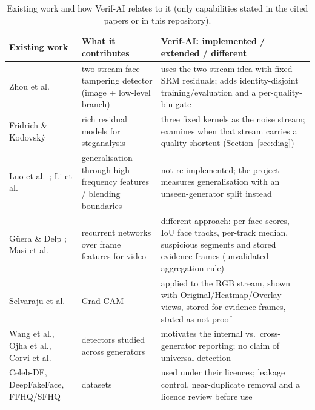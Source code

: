 \begin{table}[ht]
\centering
\caption[Existing work and how Verif-AI relates to it (only capabilities stated in the cited papers or]{Existing work and how Verif-AI relates to it (only capabilities stated in the cited papers or in this repository).}
\label{tab:novelty}
\small
\begin{tabular}{|p{3.3cm}|p{3.9cm}|p{5.6cm}|}
\hline
\textbf{Existing work} & \textbf{What it contributes} & \textbf{Verif-AI: implemented / extended / different} \\ \hline
Zhou et al.\ \citep{zhou2017twostream} & two-stream face-tampering detector (image + low-level branch) & uses the two-stream idea with fixed SRM residuals; adds identity-disjoint training/evaluation and a per-quality-bin gate \\ \hline
Fridrich \& Kodovsk\'y \citep{fridrich2012srm} & rich residual models for steganalysis & three fixed kernels as the noise stream; examines when that stream carries a quality shortcut (Section~\ref{sec:diag}) \\ \hline
Luo et al.\ \citep{luo2021highfreq}; Li et al.\ \citep{li2020facexray} & generalisation through high-frequency features / blending boundaries & not re-implemented; the project measures generalisation with an unseen-generator split instead \\ \hline
G\"uera \& Delp \citep{guera2018rnn}; Masi et al.\ \citep{masi2020twobranch} & recurrent networks over frame features for video & different approach: per-face scores, IoU face tracks, per-track median, suspicious segments and stored evidence frames (unvalidated aggregation rule) \\ \hline
Selvaraju et al.\ \citep{selvaraju2017gradcam} & Grad-CAM & applied to the RGB stream, shown with Original/Heatmap/Overlay views, stored for evidence frames, stated as not proof \\ \hline
Wang et al., Ojha et al., Corvi et al.\ \citep{wang2020cnn,ojha2023universal,corvi2023diffusion} & detectors studied across generators & motivates the internal vs.\ cross-generator reporting; no claim of universal detection \\ \hline
Celeb-DF, DeepFakeFace, FFHQ/SFHQ \citep{li2020celebdf,song2023dff,karras2019stylegan,sfhq2022} & datasets & used under their licences; leakage control, near-duplicate removal and a licence review before use \\ \hline
\end{tabular}
\end{table}


